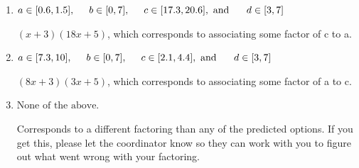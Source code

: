 \documentclass{extbook}[14pt]
\begin{document}
\begin{enumerate}
{\begin{enumerate}[label=\Alph*.]
* $(4x + 3)(6x + 5)$, which is the correct option.
\item \( a \in [0.6, 1.5], \hspace*{5mm} b \in [0, 7], \hspace*{5mm} c \in [17.3, 20.6], \text{ and } \hspace*{5mm} d \in [3, 7] \)

 $(x + 3)(18x + 5)$, which corresponds to associating some factor of c to a.
\item \( a \in [7.3, 10], \hspace*{5mm} b \in [0, 7], \hspace*{5mm} c \in [2.1, 4.4], \text{ and } \hspace*{5mm} d \in [3, 7] \)

 $(8x + 3)(3x + 5)$, which corresponds to associating some factor of a to c.
\item \( \text{None of the above.} \)

 Corresponds to a different factoring than any of the predicted options. If you get this, please let the coordinator know so they can work with you to figure out what went wrong with your factoring.
\end{enumerate}

}
\end{enumerate}
\end{document}
